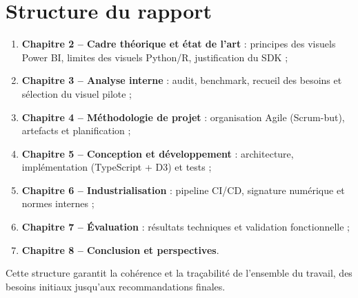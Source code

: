 \section{Structure du rapport}

\begin{enumerate}
  \item \textbf{Chapitre 2 – Cadre théorique et état de l’art} : principes des visuels Power BI, limites des visuels Python/R, justification du SDK ;
  \item \textbf{Chapitre 3 – Analyse interne} : audit, benchmark, recueil des besoins et sélection du visuel pilote ;
  \item \textbf{Chapitre 4 – Méthodologie de projet} : organisation Agile (Scrum-but), artefacts et planification ;
  \item \textbf{Chapitre 5 – Conception et développement} : architecture, implémentation (TypeScript + D3) et tests ;
  \item \textbf{Chapitre 6 – Industrialisation} : pipeline CI/CD, signature numérique et normes internes ;
  \item \textbf{Chapitre 7 – Évaluation} : résultats techniques et validation fonctionnelle ;
  \item \textbf{Chapitre 8 – Conclusion et perspectives}.
\end{enumerate}

\vspace{1em}
Cette structure garantit la cohérence et la traçabilité de l’ensemble du travail, des besoins initiaux jusqu’aux recommandations finales.

